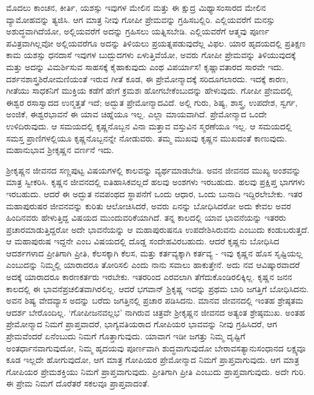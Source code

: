 ಮೊದಲು ಕಾಂಚನ, ಕೀರ್ತಿ, ಯಶಸ್ಸು ಇವುಗಳ ಮೇಲಿನ ಮತ್ತು ಈ ಕ್ಷುದ್ರ ಮಿಥ್ಯಾಸಂಸಾರದ ಮೇಲಿನ ವ್ಯಾಮೋಹವನ್ನು ತ್ಯಜಿಸಿ. ಆಗ ಮಾತ್ರ ನೀವು ಗೋಪೀ ಪ್ರೇಮವನ್ನು ಗ್ರಹಿಸಬಲ್ಲಿರಿ. ಎಲ್ಲಿಯವರೆಗೆ ಮನಸ್ಸು ಅಶುದ್ಧವಾಗಿದೆಯೋ, ಅಲ್ಲಿಯವರೆಗೆ ಅದನ್ನು ಗ್ರಹಿಸಲು ಯತ್ನಿಸಬೇಡಿ. ಎಲ್ಲಿಯವರೆಗೆ ಆತ್ಮವು ಪೂರ್ಣ ಪವಿತ್ರವಾಗಿಲ್ಲವೋ ಅಲ್ಲಿಯವರೆಗೂ ಅದನ್ನು ತಿಳಿಯಲು ಪ್ರಯತ್ನಪಡುವುದೆಲ್ಲ ವಿಫಲ. ಯಾರ ಹೃದಯದಲ್ಲಿ ಪ್ರತಿಕ್ಷಣ ಕಾಮ ಯಶಸ್ಸು ಧನದಾಸೆ ಇವುಗಳ ಬುದ್ಬುದಗಳು ಏಳುತ್ತಿವೆಯೋ, ಅವರು ಗೋಪೀ ಪ್ರೇಮವನ್ನು ತಿಳಿಯುವುದಕ್ಕೆ ಮತ್ತು ಅದನ್ನು ವಿಮರ್ಶಿಸುವ ಸಾಹಸಕ್ಕೆ ಕೈಹಾಕುವುದು ಎಂಥ ವಿಪರ್ಯಾಸ! ಕೃಷ್ಣಾವತಾರದ ಸಾರವೇ ಇದು. ದರ್ಶನಶಾಸ್ತ್ರಶಿರೋಮಣಿಯಂತೆ ಇರುವ ಗೀತೆ ಕೂಡ, ಈ ಪ್ರೇಮೋನ್ಮಾದಕ್ಕೆ ಸರಿದೂಗಲಾರದು. ಇದಕ್ಕೆ ಕಾರಣ, ಗೀತೆಯು ಸಾಧಕನಿಗೆ ಮುಕ್ತಿಯ ಕಡೆಗೆ ಹೇಗೆ ಕ್ರಮಶಃ ಹೋಗಬೇಕೆಂಬುದನ್ನು ಹೇಳುವುದು. ಗೋಪೀ ಪ್ರೇಮದಲ್ಲಿ ಈಶ್ವರ ರಸಾಸ್ವಾದದ ಉನ್ಮತ್ತತೆ ಇದೆ; ಅದ್ಭುತ ಪ್ರೇಮೋನ್ಮಾದವಿದೆ. ಅಲ್ಲಿ ಗುರು, ಶಿಷ್ಯ, ಶಾಸ್ತ್ರ, ಉಪದೇಶ, ಸ್ವರ್ಗ, ಅಂಜಿಕೆ, ಈಶ್ವರಭಾವನೆ ಈ ಯಾವ ಚಿಹ್ನೆಯೂ ಇಲ್ಲ. ಎಲ್ಲಾ ಮಾಯವಾಗಿದೆ. ಪ್ರೇಮೋನ್ಮಾದ ಒಂದೇ ಉಳಿದಿರುವುದು. ಆ ಸಮಯದಲ್ಲಿ ಕೃಷ್ಣನೊಬ್ಬನ ವಿನಾ ಮತ್ತಾವ ವಸ್ತುವಿನ ಸ್ಮರಣೆಯೂ ಇಲ್ಲ. ಆ ಸಮಯದಲ್ಲಿ ಸಮಸ್ತ ಪ್ರಾಣಿಗಳಲ್ಲಿಯೂ ಕೃಷ್ಣನೊಬ್ಬನನ್ನೇ ನೋಡುವರು. ತಮ್ಮ ಮುಖವು ಕೃಷ್ಣನ ಮುಖದಂತೆ ಕಾಣುವುದು. ಮಹಾನುಭಾವ ಶ‍್ರೀಕೃಷ್ಣನ ವರ್ಣನೆ ಇದು.

ಶ‍್ರೀಕೃಷ್ಣನ ಜೀವನದ ಸಣ್ಣಪುಟ್ಟ ವಿಷಯಗಳಲ್ಲಿ ಕಾಲವನ್ನು ವ್ಯರ್ಥಮಾಡಬೇಡಿ. ಅವನ ಜೀವನದ ಮುಖ್ಯ ಅಂಶವನ್ನು ಮಾತ್ರ ಸ್ವೀಕರಿಸಿ. ಕೃಷ್ಣನ ಜೀವನದಲ್ಲಿ ಐತಿಹಾಸಿಕವಲ್ಲದೆ ಹಲವು ಅಂಶಗಳು ಇರಬಹುದು. ಹಲವು ಪ್ರಕ್ಷಿಪ್ತ ಭಾಗಗಳು ಇರಬಹುದು. ಆದರೆ ಈ ಅದ್ಭುತ ನವಪಂಥದ ಸ್ಥಾಪನೆಗೆ ಒಂದು ಆಧಾರ, ಒಂದು ಬುನಾದಿ ಇದ್ದಿರಲೇಬೇಕು. ಇತರ ಮಹಾಪುರುಷರ ಜೀವನವನ್ನು ಕುರಿತು ಆಲೋಚಿಸಿದರೆ, ಅವರು ಏನನ್ನು ಬೋಧಿಸಿದರೋ ಅದು ಕೇವಲ ಅವರ ಹಿಂದಿನವರು ಹೇಳುತ್ತಿದ್ದ ವಿಷಯದ ಮುಂದುವರಿಕೆಯಾಗಿದೆ. ತನ್ನ ಕಾಲದಲ್ಲಿ ಯಾವ ಭಾವನೆಯನ್ನು ಇತರರು ಪ್ರಚಾರಮಾಡುತ್ತಿದ್ದರೋ ಅದೇ ಭಾವನೆಯನ್ನು ಆ ಮಹಾಪುರುಷನೂ ಉಪದೇಶಿಸಿರುವನು ಎಂಬುದು ಕಂಡುಬರುತ್ತದೆ. ಆ ಮಹಾಪುರುಷ ಇದ್ದನೇ ಎಂಬ ವಿಷಯದಲ್ಲಿ ದೊಡ್ಡ ಸಂದೇಹವಿರಬಹುದು. ಆದರೆ ಕೃಷ್ಣನು ಬೋಧಿಸಿದ ಆದರ್ಶಗಳಾದ ಪ್ರೀತಿಗಾಗಿ ಪ್ರೀತಿ, ಕೆಲಸಕ್ಕಾಗಿ ಕೆಲಸ, ಮತ್ತು ಕರ್ತವ್ಯಕ್ಕಾಗಿ ಕರ್ತವ್ಯ - ಇವು ಕೃಷ್ಣನ ಹೊಸ ಸೃಷ್ಟಿಯಲ್ಲ ಎಂಬುದನ್ನು ನಿಮ್ಮಲ್ಲಿ ಯಾರಾದರೂ ತೋರಿಸಲಿ ಎಂದು ನಾನು ಸವಾಲು ಹಾಕುತ್ತೇನೆ. ಅದು ನವ ಆವಿಷ್ಕಾರವಾದರೆ ಅದಕ್ಕೆ ಯಾರಾದರೂ ಕಾರಣಕರ್ತರು ಇರಬೇಕು. ಇತರರಿಂದ ಎರವಲಾಗಿ ತೆಗೆದುಕೊಂಡಿರ\-ಲಿಕ್ಕಿಲ್ಲ. ಕೃಷ್ಣನ ಜನನ ಕಾಲದಲ್ಲಿ ಈ ಭಾವನೆಪ್ರಚಲಿತವಾಗಿರಲಿಲ್ಲ. ಆದರೆ ಭಗವಾನ್​ ಶ್ರಿಕೃಷ್ಣ ಇದನ್ನು ಪ್ರಥಮ ಬಾರಿ ಜಗತ್ತಿಗೆ ಬೋಧಿಸಿದನು. ಅವನ ಶಿಷ್ಯ ವೇದವ್ಯಾಸ ಅದನ್ನು ಬರೆದು ಜಗತ್ತಿನಲ್ಲಿ ಪ್ರಚಾರ ಪಡಿಸಿದನು. ಮಾನವ ಜೀವನದಲ್ಲಿ ಇಂತಹ ಶ್ರೇಷ್ಠತಮ ಆದರ್ಶ ಬೇರೊಂದಿಲ್ಲ. ‘ಗೋಪೀಜನವಲ್ಲಭ’ ನಾಗಿರುವ ಚಿತ್ರವೇ ಶ‍್ರೀಕೃಷ್ಣನ ಜೀವನದ ಅತ್ಯಂತ ಶ್ರೇಷ್ಠಮುಖ. ಅಂತಹ ಪ್ರೇಮೋನ್ಮಾದ ನಿಮಗೆ ಪ್ರಾಪ್ತವಾದರೆ, ಭಾಗ್ಯವತಿಯರಾದ ಗೋಪಿಯರ ಭಾವವನ್ನು ನೀವು ಗ್ರಹಿಸಿದರೆ, ಆಗ ಪ್ರೇಮವೆಂದರೆ ಏನೆಂಬುದು ನಿಮಗೆ ಗೊತ್ತಾಗುವುದು. ಯಾವಾಗ ಇಡೀ ಜಗತ್ತು ನಿಮ್ಮ ದೃಷ್ಟಿಗೆ ಅಂತರ್ಧಾನವಾಗುವುದೋ, ನಿಮ್ಮ ಹೃದಯವು ಪೂರ್ಣವಾಗಿ ಶುದ್ಧವಾಗುವುದೋ ಬೇರಾವ\break ಸತ್ಯಾನುಸಂಧಾನದ ಲಕ್ಷ್ಯವೂ ಕೂಡ ಇಲ್ಲದೇ ಹೋಗುವುದೋ, ಆಗ ಮಾತ್ರ ಗೋಪಿಯರ ಪ್ರೇಮೋನ್ಮಾದ ನಿಮಗೆ ಪ್ರಾಪ್ತವಾಗುವುದು. ಆಗ ಮಾತ್ರ ಗೋಪಿಯರ ಪ್ರೇಮಶಕ್ತಿಯು ನಿಮಗೆ ಪ್ರಾಪ್ತವಾಗುವುದು. ಪ್ರೀತಿಗಾಗಿ ಪ್ರೀತಿ ಎಂಬುದು ಪ್ರಾಪ್ತವಾಗುವುದು. ಅದೇ ಗುರಿ. ಈ ಪ್ರೇಮ ನಿಮಗೆ ದೊರೆತರೆ ಸಕಲವೂ ಪ್ರಾಪ್ತವಾದಂತೆ.

